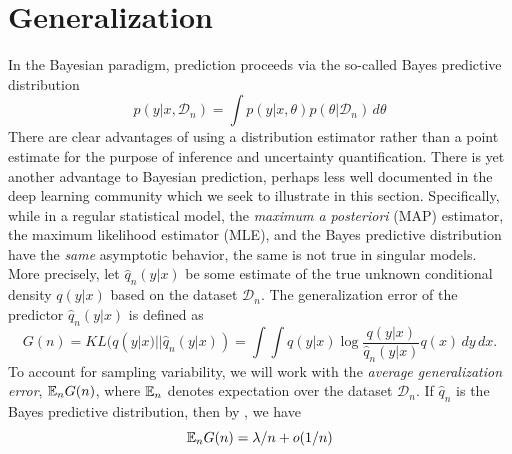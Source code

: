 \documentclass{article} %
\begin{document}
\section{Generalization}\label{section:gen_error}
In the Bayesian paradigm, prediction proceeds via the so-called Bayes predictive distribution
\begin{equation}
p(y|x, \mathcal D_n) = \int p(y|x,\theta) p(\theta|\mathcal D_n) \,d\theta
\label{eq:bayes_pred_dist}
\end{equation}
There are clear advantages of using a distribution estimator rather than a point estimate for the purpose of inference and uncertainty quantification.
There is yet another advantage to Bayesian prediction, perhaps less well documented in the deep learning community which we seek to illustrate in this section. 
Specifically, while in a regular statistical model, the \textit{maximum a posteriori} (MAP) estimator, the maximum likelihood estimator (MLE), and the Bayes predictive distribution have the \textit{same} asymptotic behavior, the same is not true in singular models.
More precisely, let $\hat q_n(y|x)$ be some estimate of the true unknown conditional density $q(y|x)$ based on the dataset $\mathcal D_n$. The generalization error of the predictor $\hat q_n(y|x)$ is defined as
$$
G(n) = KL (q(y|x) || \hat q_n(y|x) ) = \int  \int q(y|x) \log \frac{q(y|x)}{\hat q_n(y|x)} q(x) \,dy  \,dx.
$$
To account for sampling variability, we will work with the \textit{average generalization error}, ${\mathbb{E}}_n G(n)$, where ${\mathbb{E}}_n$ denotes expectation over the dataset $\mathcal D_n$.
If $\hat q_n$ is the Bayes predictive distribution, then by {\citet[Theorem 1.2 and Theorem 7.2]{watanabe_algebraic_2009}}, we have
\begin{equation}
{\mathbb{E}}_n G(n) = \lambda/n + o(1/n)
\label{eq:RLCT_generalization}
\end{equation}
\end{document}
